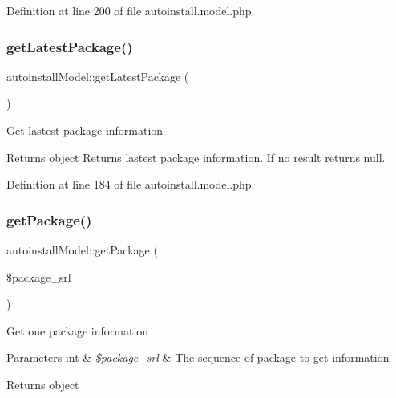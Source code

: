 Definition at line 200 of file autoinstall.\+model.\+php.

\mbox{\label{classautoinstallModel_a237e95933e438cec978e9382dfee6199}} 
\subsubsection{\texorpdfstring{get\+Latest\+Package()}{getLatestPackage()}}
{\footnotesize\ttfamily autoinstall\+Model\+::get\+Latest\+Package (\begin{DoxyParamCaption}{ }\end{DoxyParamCaption})}

Get lastest package information

\begin{DoxyReturn}{Returns}
object Returns lastest package information. If no result returns null. 
\end{DoxyReturn}


Definition at line 184 of file autoinstall.\+model.\+php.

\mbox{\label{classautoinstallModel_aaa22f977e7ba5720afda446a6e508c51}} 
\subsubsection{\texorpdfstring{get\+Package()}{getPackage()}}
{\footnotesize\ttfamily autoinstall\+Model\+::get\+Package (\begin{DoxyParamCaption}\item[{}]{\$package\+\_\+srl }\end{DoxyParamCaption})}

Get one package information


\begin{DoxyParams}[1]{Parameters}
int & {\em \$package\+\_\+srl} & The sequence of package to get information \\
\hline
\end{DoxyParams}
\begin{DoxyReturn}{Returns}
object 
\end{DoxyReturn}


